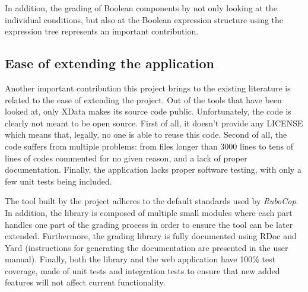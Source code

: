 In addition, the grading of Boolean components by not only looking at the individual conditions, but also at the Boolean expression structure using the expression tree represents an important contribution.

\subsection{Ease of extending the application}
Another important contribution this project brings to the existing literature is related to the ease of extending the project. Out of the tools that have been looked at, only XData makes its source code public. Unfortunately, the code is clearly not meant to be open source. First of all, it doesn't provide any LICENSE which means that, legally, no one is able to reuse this code. Second of all, the code suffers from multiple problems: from files longer than 3000 lines to tens of lines of codes commented for no given reason, and a lack of proper documentation. Finally, the application lacks proper software testing, with only a few unit tests being included.

The tool built by the project adheres to the default standards used by \textit{RuboCop}. In addition, the library is composed of multiple small modules where each part handles one part of the grading process in order to ensure the tool can be later extended. Furthermore, the grading library is fully documented using RDoc and Yard (instructions for generating the documentation are presented in the user manual). Finally, both the library and the web application have 100\% test coverage, made of unit tests and integration tests to ensure that new added features will not affect current functionality.

